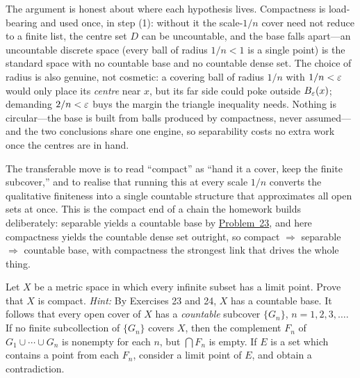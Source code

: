 \documentclass[main.tex]{subfiles}
\begin{document}
\begin{Reflection}
The argument is honest about where each hypothesis lives. Compactness is load-bearing and used once, in
step (1): without it the scale-$1/n$ cover need not reduce to a finite list, the centre set $D$ can be
uncountable, and the base falls apart---an uncountable discrete space (every ball of radius $1/n<1$ is a
single point) is the standard space with no countable base and no countable dense set. The choice of
radius is also genuine, not cosmetic: a covering ball of radius $1/n$ with $1/n<\varepsilon$ would only place
its \emph{centre} near $x$, but its far side could poke outside $B_\varepsilon(x)$; demanding $2/n<\varepsilon$ buys
the margin the triangle inequality needs. Nothing is circular---the base is built from balls produced by
compactness, never assumed---and the two conclusions share one engine, so separability costs no extra
work once the centres are in hand.

The transferable move is to read ``compact'' as ``hand it a cover, keep the finite subcover,'' and to
realise that running this at every scale $1/n$ converts the qualitative finiteness into a single
countable structure that approximates all open sets at once. This is the compact end of a chain the
homework builds deliberately: separable yields a countable base by \hyperlink{prob:23}{Problem~23}, and
here compactness yields the countable dense set outright, so compact $\Rightarrow$ separable
$\Rightarrow$ countable base, with compactness the strongest link that drives the whole thing.
\end{Reflection}

Let $X$ be a metric space in which every infinite subset has a limit point. Prove that $X$ is compact.
\emph{Hint:} By Exercises 23 and 24, $X$ has a countable base. It follows that every open cover of $X$
has a \emph{countable} subcover $\{G_n\}$, $n=1,2,3,\ldots$. If no finite subcollection of $\{G_n\}$
covers $X$, then the complement $F_n$ of $G_1\cup\cdots\cup G_n$ is nonempty for each $n$, but $\bigcap
F_n$ is empty. If $E$ is a set which contains a point from each $F_n$, consider a limit point of $E$,
and obtain a contradiction.
\end{document}
